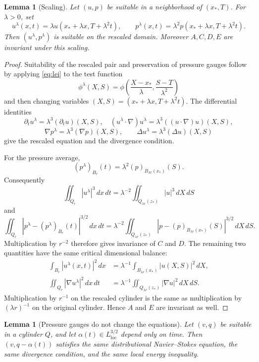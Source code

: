 \documentclass[11pt]{amsart}
\theoremstyle{plain}
\newtheorem{lemma}[theorem]{Lemma}
\theoremstyle{definition}
\theoremstyle{remark}
\numberwithin{equation}{section}
\newcommand{\loc}{\mathrm{loc}}
\begin{document}
\begin{lemma}[Scaling]\label{lem:scaling}
Let \((u,p)\) be suitable in a neighborhood of \((x_*,T)\).  For
\(\lambda>0\), set
\[
   u^\lambda(x,t)=\lambda u(x_*+\lambda x,T+\lambda^2t),
   \qquad
   p^\lambda(x,t)=\lambda^2p(x_*+\lambda x,T+\lambda^2t).
\]
Then \((u^\lambda,p^\lambda)\) is suitable on the rescaled domain.  Moreover
\(A,C,D,E\) are invariant under this scaling.
\end{lemma}

\begin{proof}
Suitability of the rescaled pair and preservation of pressure gauges follow
by applying \eqref{eq:lei} to the test function
\[
   \phi^\lambda(X,S)
   =
   \phi\left(\frac{X-x_*}{\lambda},\frac{S-T}{\lambda^2}\right)
\]
and then changing variables
\((X,S)=(x_*+\lambda x,T+\lambda^2t)\).  The differential identities
\[
   \partial_tu^\lambda=\lambda^3(\partial_tu)(X,S),\quad
   (u^\lambda\cdot\nabla)u^\lambda
      =\lambda^3((u\cdot\nabla)u)(X,S),
\]
\[
   \nabla p^\lambda=\lambda^3(\nabla p)(X,S),\qquad
   \Delta u^\lambda=\lambda^3(\Delta u)(X,S)
\]
give the rescaled equation and the divergence condition.

For the pressure average,
\[
   (p^\lambda)_{B_r}(t)
   =
   \lambda^2(p)_{B_{\lambda r}(x_*)}(S).
\]
Consequently
\[
   \iint_{Q_r}|u^\lambda|^3\,dx\,dt
   =
   \lambda^{-2}\iint_{Q_{\lambda r}(z_*)}|u|^3\,dX\,dS
\]
and
\[
   \iint_{Q_r}|p^\lambda-(p^\lambda)_{B_r}(t)|^{3/2}\,dx\,dt
   =
   \lambda^{-2}
   \iint_{Q_{\lambda r}(z_*)}
   |p-(p)_{B_{\lambda r}(x_*)}(S)|^{3/2}\,dX\,dS .
\]
Multiplication by \(r^{-2}\) therefore gives invariance of \(C\) and \(D\).
The remaining two quantities have the same critical dimensional balance:
\begin{align*}
   \int_{B_r}|u^\lambda(x,t)|^2\,dx
   &=
   \lambda^{-1}\int_{B_{\lambda r}(x_*)}|u(X,S)|^2\,dX,\\
   \iint_{Q_r}|\nabla u^\lambda|^2\,dx\,dt
   &=
   \lambda^{-1}\iint_{Q_{\lambda r}(z_*)}|\nabla u|^2\,dX\,dS .
\end{align*}
Multiplication by \(r^{-1}\) on the rescaled cylinder is the same as
multiplication by \((\lambda r)^{-1}\) on the original cylinder.  Hence
\(A\) and \(E\) are invariant as well.
\end{proof}

\begin{lemma}[Pressure gauges do not change the equations]
\label{lem:gauges}
Let \((v,q)\) be suitable in a cylinder \(Q\), and let
\(\alpha(t)\in L^{3/2}_{\loc}\) depend only on time.  Then
\((v,q-\alpha(t))\) satisfies the same distributional Navier--Stokes equation,
the same divergence condition, and the same local energy inequality.
\end{lemma}
\end{document}
